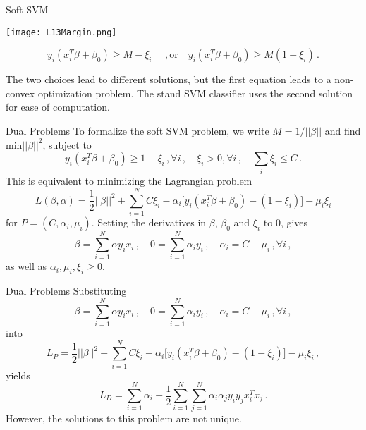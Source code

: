 \documentclass[10pt, table, dvipsnames,xcdraw]{beamer}
\begin{document}
\begin{frame}[fragile]{Soft SVM}
  \begin{minipage}[t][0.5\textheight][t]{\textwidth}
	\centering \texttt{[image: L13Margin.png]}
  \end{minipage}
  \vfill
\begin{minipage}[t][0.5\textheight][t]{\textwidth}
$$
y_i(x_i^T\beta + \beta_0) \geq M - \xi_i\,\hspace{1em}\,,\text{or}\hspace{1em}
y_i(x_i^T\beta + \beta_0) \geq M(1 - \xi_i)\,.
$$

The two choices lead to different solutions, but the first equation leads to a non-convex optimization problem. The stand SVM classifier uses the second solution for ease of computation. 
\end{minipage}
\end{frame}




\begin{frame}[fragile]{Dual Problems}
To formalize the soft SVM problem, we write $M = 1/||\beta||$ and find $\text{min}||\beta||^2$, subject to
$$
y_i(x_i^T\beta + \beta_0) \geq 1 - \xi_i\,,\forall i\,,\hspace{1em}\xi_i>0,\forall i\,,\hspace{1em}\sum_i \xi_i \leq C\,.
$$
This is equivalent to minimizing the Lagrangian problem
$$
L(\beta, \alpha) = \frac12 ||\beta||^2  + \sum_{i=1}^N C\xi_i -  \alpha_i\big[y_i(x_i^T\beta + \beta_0) -(1-\xi_i)\big] - \mu_i\xi_i
$$
for $P= (C,\alpha_i,\mu_i)$. \pause Setting the derivatives in $\beta$, $\beta_0$ and $\xi_i$ to 0, gives
$$
\beta = \sum_{i=1}^N \alpha y_ix_i\,,\hspace{1em} 0 = \sum_{i=1}^N\alpha_iy_i\,, \hspace{1em} \alpha_i = C-\mu_i\,,\forall i\,,
$$
as well as $\alpha_i, \mu_i, \xi_i\geq 0$. 
\end{frame}







\begin{frame}[fragile]{Dual Problems}
Substituting 
$$
\beta = \sum_{i=1}^N \alpha y_ix_i\,,\hspace{1em} 0 = \sum_{i=1}^N\alpha_iy_i\,, \hspace{1em} \alpha_i = C-\mu_i\,,\forall i\,,
$$\pause
into
$$
L_P = \frac{1}{2}||\beta||^2 + \sum_{i=1}^NC\xi_i - \alpha_i\big[y_i(x_i^T\beta + \beta_0) -(1-\xi_i)\big] - \mu_i\xi_i\,,
$$
yields
$$
L_D = \sum_{i=1}^N\alpha_i - \frac12 \sum_{i=1}^N\sum_{j=1}^N \alpha_i\alpha_jy_iy_jx_i^Tx_j\,.
$$
However, the solutions to this problem are not unique. 
\end{frame}
\end{document}
